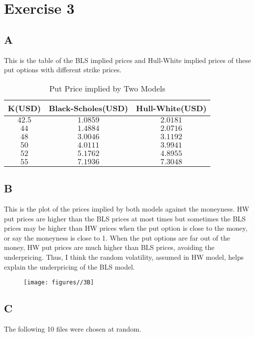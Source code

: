 \documentclass{report}
\begin{document}
\section{Exercise 3}

\subsection{A}
This is the table of the BLS implied prices and Hull-White implied prices of these put options with different strike prices.
\begin{table}[H]
\centering
\begin{tabular}{|c|c|c|}
\hline
K(USD)&Black-Scholes(USD)&Hull-White(USD)\\
\hline
$42.5$& $1.0859$ & $2.0181$ \\
\hline
$44$& $1.4884$ & $2.0716$ \\
\hline
$48$& $3.0046$ & $3.1192$ \\
\hline
$50$& $4.0111$ & $3.9941$ \\
\hline
$52$& $5.1762$ & $4.8955$ \\
\hline
$55$& $7.1936$ & $7.3048$ \\
\hline
\end{tabular}
\caption{ Put Price implied by Two Models}
\end{table}

\subsection{B}
This is the plot of the prices implied by both models against the moneyness. HW put prices are higher than the BLS prices at most times but sometimes the BLS prices may be higher than HW prices when the put option is close to the money, or say the moneyness is close to 1. When the put options are far out of the money, HW put prices are much higher than BLS prices, avoiding the underpricing. Thus, I think the random volatility, assumed in HW model, helps explain the underpricing of the BLS model.
\begin{figure}[H]
        \centering 
         \texttt{[image: figures//3B]}
\end{figure}

\subsection{C}
The following 10 files were chosen at random.
\end{document}
